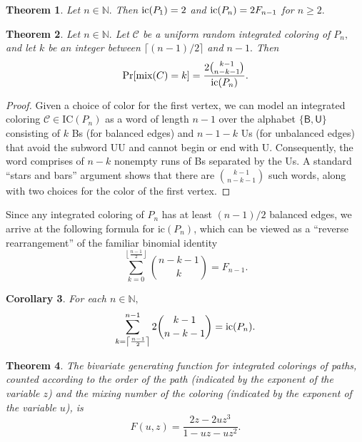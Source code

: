 \documentclass[11pt, reqno]{amsart}
\newtheorem{theorem}{Theorem} %
\newtheorem{corollary}[theorem]{Corollary}
\theoremstyle{definition}
\renewcommand{\geq}{\geqslant}
\begin{document}
\begin{theorem}
Let $n \in \mathbb{N}.$ Then $\textup{ic}(P_1) = 2$ and $\textup{ic}(P_n) = 2F_{n-1}$ for $n \geq 2.$
\end{theorem}

\begin{theorem}
Let $n \in \mathbb{N}.$ Let $\mathcal{C}$ be a uniform random integrated coloring of $P_n,$ and let $k$ be an integer between $\lceil (n-1)/2 \rceil$ and $n-1.$ Then
\[\textup{Pr}[\textup{mix}(C) = k] = \frac{2\binom{k-1}{n-k-1}}{\textup{ic}(P_n)}.\]
\end{theorem}

\begin{proof}
Given a choice of color for the first vertex, we can model an integrated coloring $\mathcal{C} \in \text{IC}(P_n)$ as a word of length $n - 1$ over the alphabet $\{\textsf{B}, \textsf{U}\}$ consisting of $k$ \textsf{B}s (for balanced edges) and $n - 1 - k$ \textsf{U}s (for unbalanced edges) that avoid the subword \textsf{UU} and cannot begin or end with \textsf{U}. Consequently, the word comprises of $n - k$ nonempty runs of \textsf{B}s separated by the \textsf{U}s. A standard ``stars and bars'' argument shows that there are $\binom{k - 1}{n - k - 1}$ such words, along with two choices for the color of the first vertex.
\end{proof}

Since any integrated coloring of $P_n$ has at least $(n-1)/2$ balanced edges, we arrive at the following formula for $\text{ic}(P_n)$, which can be viewed as a ``reverse rearrangement'' of the familiar binomial identity
\[\sum_{k = 0}^{\left\lfloor \frac{n-1}{2} \right\rfloor} \binom{n - k - 1}{k} = F_{n-1}.\]

\begin{corollary}
For each $n \in \mathbb{N},$
\[\sum_{k=\left\lceil \frac{n - 1}{2} \right\rceil}^{n-1} 2\binom{k-1}{n-k-1} = \textup{ic}(P_n).\]
\end{corollary}

\begin{theorem}
The bivariate generating function for integrated colorings of paths, counted according to the order of the path (indicated by the exponent of the variable $z$) and the mixing number of the coloring (indicated by the exponent of the variable $u$), is
\[F(u, z) = \frac{2z-2uz^3}{1-uz-uz^2}.\]
\end{theorem}
\end{document}
